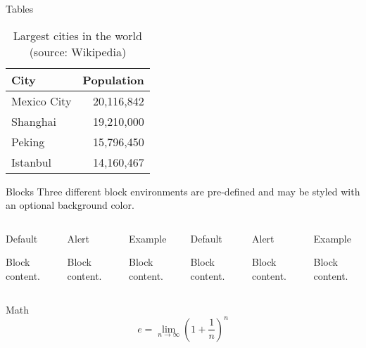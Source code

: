 \documentclass{beamer}
\renewenvironment{block}[1]
{\begin{oldblock}{#1}
		\vspace{0pt}
	}
	{ 
	\end{oldblock}
}
\renewenvironment{exampleblock}[1]
{\begin{oldexampleblock}{#1}
		\vspace{0pt}
	}
	{ 
	\end{oldexampleblock}
}
\renewenvironment{alertblock}[1]
{\begin{oldalertblock}{#1}
		\vspace{0pt}
	}
	{ 
	\end{oldalertblock}
}
\begin{document}
\begin{frame}{Tables}
	\begin{table}
		\caption{Largest cities in the world (source: Wikipedia)}
		\begin{tabular}{lr}
			\toprule
			City & Population\\
			\midrule
			Mexico City & 20,116,842\\
			Shanghai & 19,210,000\\
			Peking & 15,796,450\\
			Istanbul & 14,160,467\\
			\bottomrule
		\end{tabular}
	\end{table}
\end{frame}
\begin{frame}{Blocks}
	Three different block environments are pre-defined and may be styled with an
	optional background color.
	
	\begin{columns}[T,onlytextwidth]
		\begin{block}{Default}
			Block content.
		\end{block}
		
		\begin{alertblock}{Alert}
			Block content.
		\end{alertblock}
		
		\begin{exampleblock}{Example}
			Block content.
		\end{exampleblock}
		
		
		
		\begin{block}{Default}
			Block content.
		\end{block}
		
		\begin{alertblock}{Alert}
			Block content.
		\end{alertblock}
		
		\begin{exampleblock}{Example}
			Block content.
		\end{exampleblock}
		
	\end{columns}
\end{frame}
\begin{frame}{Math}
	\begin{equation*}
		e = \lim_{n\to \infty} \left(1 + \frac{1}{n}\right)^n
	\end{equation*}
\end{frame}
\end{document}
